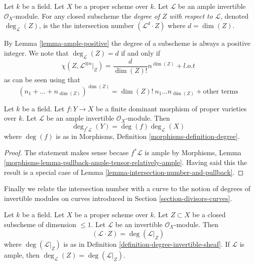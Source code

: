 \begin{definition}
\label{definition-degree}
Let $k$ be a field. Let $X$ be a proper scheme over $k$. Let
$\mathcal{L}$ be an ample invertible $\mathcal{O}_X$-module.
For any closed subscheme the {\it degree of $Z$ with respect to
$\mathcal{L}$}, denoted $\deg_\mathcal{L}(Z)$, is the
the intersection number $(\mathcal{L}^d \cdot Z)$
where $d = \dim(Z)$.
\end{definition}

\noindent
By Lemma \ref{lemma-ample-positive} the degree of a subscheme is always a
positive integer. We note that $\deg_\mathcal{L}(Z) = d$ if and only if
$$
\chi(Z, \mathcal{L}^{\otimes n}|_Z) = \frac{d}{\dim(Z)!} n^{\dim(Z)} + l.o.t
$$
as can be seen using that
$$
(n_1 + \ldots + n_{\dim(Z)})^{\dim(Z)} =
\dim(Z)!\ n_1 \ldots n_{\dim(Z)} + \text{other terms}
$$

\begin{lemma}
\label{lemma-degree-finite-morphism-in-terms-degrees}
Let $k$ be a field. Let $f : Y \to X$ be a finite
dominant morphism of proper varieties over $k$. Let $\mathcal{L}$
be an ample invertible $\mathcal{O}_X$-module.
Then
$$
\deg_{f^*\mathcal{L}}(Y) = \deg(f) \deg_\mathcal{L}(X)
$$
where $\deg(f)$ is as in
Morphisms, Definition \ref{morphisms-definition-degree}.
\end{lemma}

\begin{proof}
The statement makes sense becase $f^*\mathcal{L}$ is ample by
Morphisms, Lemma \ref{morphisms-lemma-pullback-ample-tensor-relatively-ample}.
Having said this the result is a special case of
Lemma \ref{lemma-intersection-number-and-pullback}.
\end{proof}

\noindent
Finally we relate the intersection number with a curve to the notion
of degrees of invertible modules on curves introduced in
Section \ref{section-divisors-curves}.

\begin{lemma}
\label{lemma-intersection-numbers-and-degrees-on-curves}
Let $k$ be a field. Let $X$ be a proper scheme over $k$.
Let $Z \subset X$ be a closed subscheme of dimension $\leq 1$.
Let $\mathcal{L}$ be an invertible $\mathcal{O}_X$-module.
Then
$$
(\mathcal{L} \cdot Z) = \deg(\mathcal{L}|_Z)
$$
where $\deg(\mathcal{L}|_Z)$ is as in
Definition \ref{definition-degree-invertible-sheaf}.
If $\mathcal{L}$ is ample, then
$\deg_\mathcal{L}(Z) = \deg(\mathcal{L}|_Z)$.
\end{lemma}

